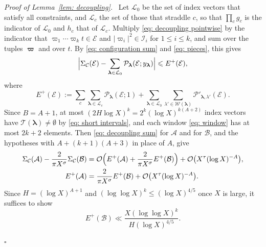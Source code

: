 \documentclass{article}
\numberwithin{equation}{section}
\newenvironment{proof}[1][Proof]{\par\medskip\noindent\textit{#1.}\ }{\hfill$\square$\par\medskip}
\newcommand{\Le}{\leqslant}
\begin{document}
\begin{proof}[Proof of Lemma~\ref{lem: decoupling}]
Let $\mathcal{L}_0$ be the set of index vectors that satisfy all constraints, and $\mathcal{L}_c$ the set of those that straddle $c$, so that $\prod_c g_c$ is the indicator of $\mathcal{L}_0$ and $h_c$ that of $\mathcal{L}_c$. Multiply \eqref{eq: decoupling pointwise} by the indicator that $\varpi_1 \cdots \varpi_k t \in \mathcal{E}$ and $|\varpi_i|^2 \in \mathcal{I}_i$ for $1 \Le i \Le k$, and sum over the tuples $\boldsymbol{\varpi}$ and over $t$. By \eqref{eq: configuration sum} and \eqref{eq: pieces}, this gives
\begin{equation}
\label{eq: decoupling sum}
\Bigl| \Sigma_{\mathcal{C}}(\mathcal{E}) - \sum_{\boldsymbol{\lambda} \in \mathcal{L}_0} \mathcal{P}_{\boldsymbol{\lambda}}(\mathcal{E}; y_{\boldsymbol{\lambda}}) \Bigr| \Le E^+(\mathcal{E}),
\end{equation}
where
\begin{equation*}
E^+(\mathcal{E}) := \sum_c \sum_{\boldsymbol{\lambda} \in \mathcal{L}_c} \mathcal{P}_{\boldsymbol{\lambda}}(\mathcal{E}; 1) + \sum_{\boldsymbol{\lambda} \in \mathcal{L}_0} \sum_{\lambda' \in \mathcal{W}(\boldsymbol{\lambda})} \mathcal{P}'_{\boldsymbol{\lambda},\lambda'}(\mathcal{E}).
\end{equation*}
Since $B = A + 1$, at most $(2H \log X)^k = 2^k (\log X)^{k(A+2)}$ index vectors have $\mathcal{T}(\boldsymbol{\lambda}) \neq \emptyset$ by \eqref{eq: short intervals}, and each window \eqref{eq: window} has at most $2k + 2$ elements. Then \eqref{eq: decoupling sum} for $\mathcal{A}$ and for $\mathcal{B}$, and the hypotheses with $A + (k+1)(A+3)$ in place of $A$, give
\begin{align*}
\Sigma_{\mathcal{C}}(\mathcal{A}) - \frac{2}{\pi X^{\sigma}}\Sigma_{\mathcal{C}}(\mathcal{B}) &= \mathcal{O}\Bigl(E^+(\mathcal{A}) + \frac{2}{\pi X^{\sigma}} E^+(\mathcal{B})\Bigr) + \mathcal{O}\bigl(X^{\tau}(\log X)^{-A}\bigr), \\
E^+(\mathcal{A}) &= \frac{2}{\pi X^{\sigma}} E^+(\mathcal{B}) + \mathcal{O}\bigl(X^{\tau}(\log X)^{-A}\bigr).
\end{align*}
Since $H = (\log X)^{A+1}$ and $(\log\log X)^k \Le (\log X)^{4/5}$ once $X$ is large, it suffices to show
\begin{equation}
\label{eq: diagonal bound}
E^+(\mathcal{B}) \ll \frac{X (\log\log X)^k}{H (\log X)^{4/5}}.
\end{equation}


\end{proof}
\end{document}
